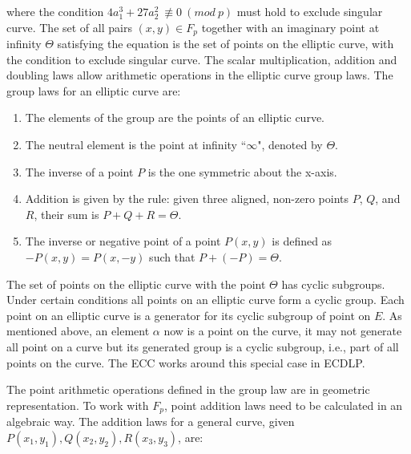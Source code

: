 where the condition $4a_1^3 + 27a_2^2 \ \not\equiv 0 \ (mod \ p)$ must hold to exclude singular curve. The set of all pairs $(x,y) \in F_p$ together with an imaginary point at infinity $\Theta$ satisfying the equation is the set of points on the elliptic curve, with the condition to exclude singular curve. The scalar multiplication, addition and doubling laws allow arithmetic operations in the elliptic curve group laws. The group laws for an elliptic curve are:

\begin{enumerate}
  \item The elements of the group are the points of an elliptic curve.
  \item The neutral element is the point at infinity ``$\infty$", denoted by $\Theta$.
  \item The inverse of a point $P$ is the one symmetric about the x-axis.
  \item Addition is given by the rule: given three aligned, non-zero points $P$, $Q$, and $R$, their sum is $P + Q + R = \Theta$.
  \item The inverse or negative point of a point $P(x,y)$ is defined as $-P(x,y) = P(x,-y)$ such that $P + (-P) = \Theta$.
\end{enumerate}

The set of points on the elliptic curve with the point $\Theta$ has cyclic subgroups. Under certain conditions all points on an elliptic curve form a cyclic group. Each point on an elliptic curve is a generator for its cyclic subgroup of point on $E$. As mentioned above, an element $\alpha$ now is a point on the curve, it may not generate all point on a curve but its generated group is a cyclic subgroup, i.e., part of all points on the curve. The ECC works around this special case in ECDLP.

The point arithmetic operations defined in the group law are in geometric representation. To work with $F_p$, point addition laws need to be calculated in an algebraic way. The addition laws for a general curve, given $P(x_1, y_1), Q(x_2, y_2), R(x_3, y_3)$, are:

